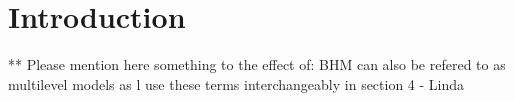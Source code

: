 \section{Introduction}

** Please mention here something to the effect of: BHM can also be refered to as multilevel models as l use these terms interchangeably in section 4 - Linda
